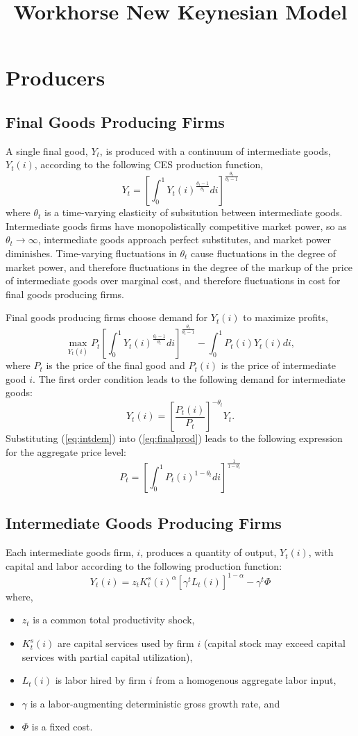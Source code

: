 \documentclass[11pt]{article}
\newcommand{\bi}{\begin{itemize}}
\newcommand{\ei}{\end{itemize}}
\newcommand{\beq}{\begin{equation}}
\newcommand{\eeq}{\end{equation}}
\begin{document}
\title{Workhorse New Keynesian Model}
\author{}\date{}

\maketitle
\thispagestyle{empty}
\section{Producers}
\subsection{Final Goods Producing Firms}
A single final good, $Y_t$, is produced with a continuum of intermediate goods, $Y_t(i)$, according to the following CES production function,
\beq \label{eq:finalprod} Y_t = \left[ \int_0^1 Y_t(i)^{\frac{\theta_t-1}{\theta_t}} di \right]^{\frac{\theta_t}{\theta_t-1}} \eeq
where $\theta_t$ is a time-varying elasticity of subsitution between intermediate goods.  Intermediate goods firms have monopolistically competitive market power, so as $\theta_t \rightarrow \infty$, intermediate goods approach perfect substitutes, and market power diminishes.  Time-varying fluctuations in $\theta_t$ cause fluctuations in the degree of market power, and therefore fluctuations in the degree of the markup of the price of intermediate goods over marginal cost, and therefore fluctuations in cost for final goods producing firms.

Final goods producing firms choose demand for $Y_t(i)$ to maximize profits,
\beq \max_{Y_t(i)} P_t \left[ \int_0^1 Y_t(i)^{\frac{\theta_t-1}{\theta_t}} di \right]^{\frac{\theta_t}{\theta_t-1}} - \int_0^1 P_t(i) Y_t(i) di, \eeq
where $P_t$ is the price of the final good and $P_t(i)$ is the price of intermediate good $i$.  The first order condition leads to the following demand for intermediate goods:
\beq \label{eq:intdem} Y_t(i) = \left[\frac{P_t(i)}{P_t}\right]^{-\theta_t} Y_t. \eeq
Substituting (\ref{eq:intdem}) into (\ref{eq:finalprod}) leads to the following expression for the aggregate price level:
\beq \label{eq:aggprice} P_t = \left[ \int_0^1 P_t(i)^{1-\theta_t} di \right]^{\frac{1}{1-\theta_t}} \eeq

\subsection{Intermediate Goods Producing Firms}
Each intermediate goods firm, $i$, produces a quantity of output, $Y_t(i)$, with capital and labor according to the following production function:
\beq \label{eq:intprod} Y_t(i) = z_t K_t^s(i)^{\alpha}\left[\gamma^t L_t(i) \right]^{1-\alpha} - \gamma^t \Phi \eeq
where,
\bi
\item $z_t$ is a common total productivity shock,
\item $K_t^s(i)$ are capital services used by firm $i$ (capital stock may exceed capital services with partial capital utilization),
\item $L_t(i)$ is labor hired by firm $i$ from a homogenous aggregate labor input,
\item $\gamma$ is a labor-augmenting deterministic gross growth rate, and
\item $\Phi$ is a fixed cost.
\ei
\end{document}
